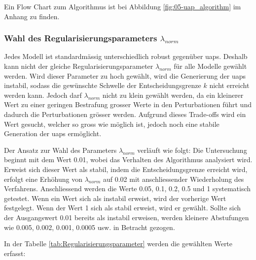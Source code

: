 Ein Flow Chart zum Algorithmus ist bei Abbildung \ref{fig:05-uap_algorithm} im Anhang zu finden. 

\subsubsection{Wahl des Regularisierungsparameters \texorpdfstring{$\lambda_{norm}$}{lambda\_norm}} \label{chap:wahl des Regularisierungsparameters}
Jedes Modell ist standardmässig unterschiedlich robust gegenüber \acrshort{uap}s. Deshalb kann nicht der gleiche Regularisierungsparameter $\lambda_{norm}$ für alle Modelle gewählt werden. Wird dieser Parameter zu hoch gewählt, wird die Generierung der \acrshort{uap}s instabil, sodass die gewünschte Schwelle der Entscheidungsgrenze $k$ nicht erreicht werden kann. Jedoch darf $\lambda_{norm}$ nicht zu klein gewählt werden, da ein kleinerer Wert zu einer geringen Bestrafung grosser Werte in den Perturbationen führt und dadurch die Perturbationen grösser werden. Aufgrund dieses Trade-offs wird ein Wert gesucht, welcher so gross wie möglich ist, jedoch noch eine stabile Generation der \acrshort{uap}s ermöglicht.

Der Ansatz zur Wahl des Parameters $\lambda_{norm}$ verläuft wie folgt: Die Untersuchung beginnt mit dem Wert 0.01, wobei das Verhalten des Algorithmus analysiert wird. Erweist sich dieser Wert als stabil, indem die Entscheidungsgrenze erreicht wird, erfolgt eine Erhöhung von $\lambda_{norm}$ auf 0.02 mit anschliessender Wiederholung des Verfahrens. Anschliessend werden die Werte 0.05, 0.1, 0.2, 0.5 und 1 systematisch getestet. Wenn ein Wert sich als instabil erweist, wird der vorherige Wert festgelegt. Wenn der Wert 1 sich als stabil erweist, wird er gewählt. Sollte sich der Ausgangswert 0.01 bereits als instabil erweisen, werden kleinere Abstufungen wie 0.005, 0.002, 0.001, 0.0005 usw. in Betracht gezogen.

In der Tabelle \ref{tab:Regularisierungsparameter} werden die gewählten Werte erfasst:

